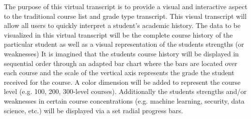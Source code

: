 The purpose of this virtual transcript is to provide a visual and interactive aspect to the traditional course list and grade type transcript. This visual transcript will allow all users to quickly interpret a student's academic history. The data to be visualized in this virtual transcript will be the complete course history of the particular student as well as a visual representation of the students strengths (or weaknesses) It is imagined that the students course history will be displayed in sequential order through an adapted bar chart where the bars are located over each course and the scale of the vertical axis represents the grade the student received for the course. A color dimension will be added to represent the course level (e.g. 100, 200, 300-level courses). Additionally the students strengths and/or weaknesses in certain course concentrations (e.g. machine learning, security, data science, etc.) will be displayed via a set radial progress bars.
